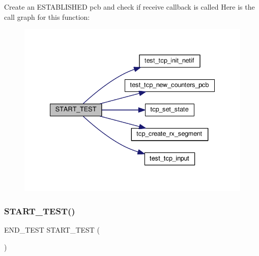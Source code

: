 Create an E\+S\+T\+A\+B\+L\+I\+S\+H\+ED pcb and check if receive callback is called Here is the call graph for this function\+:
\nopagebreak
\begin{figure}[H]
\begin{center}
\leavevmode
\includegraphics[width=335pt]{openmote-cc2538_2lwip_2test_2unit_2tcp_2test__tcp_8c_a473c18820b30ed72ac3ffd91ecab2e8f_cgraph}
\end{center}
\end{figure}
\mbox{\label{openmote-cc2538_2lwip_2test_2unit_2tcp_2test__tcp_8c_a22b7d73dfb2feb77f981da6749639ce6}} 
\subsubsection{\texorpdfstring{S\+T\+A\+R\+T\+\_\+\+T\+E\+S\+T()}{START\_TEST()}\hspace{0.1cm}{\footnotesize\ttfamily [3/8]}}
{\footnotesize\ttfamily E\+N\+D\+\_\+\+T\+E\+ST S\+T\+A\+R\+T\+\_\+\+T\+E\+ST (\begin{DoxyParamCaption}\item[{test\+\_\+tcp\+\_\+malformed\+\_\+header}]{ }\end{DoxyParamCaption})}

